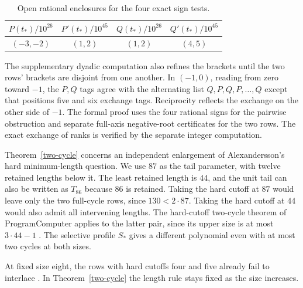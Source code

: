 \begin{table}[ht]
\centering
\begin{tabular}{@{}cccc@{}}
\hline
$P(t_\ast)/10^{26}$ & $P'(t_\ast)/10^{45}$ &
$Q(t_\ast)/10^{26}$ & $Q'(t_\ast)/10^{45}$\\ \hline
$(-3,-2)$ & $(1,2)$ & $(1,2)$ & $(4,5)$\\ \hline
\end{tabular}
\caption{Open rational enclosures for the four exact sign tests.}\label{two-cycle-signs}
\end{table}

The supplementary dyadic computation also refines the brackets until the two rows' brackets are disjoint from one another. In $(-1,0)$, reading from zero toward $-1$, the $P,Q$ tags agree with the alternating list $Q,P,Q,P,\ldots,Q$ except that positions five and six exchange tags. Reciprocity reflects the exchange on the other side of $-1$. The formal proof uses the four rational signs for the pairwise obstruction and separate full-axis negative-root certificates for the two rows. The exact exchange of ranks is verified by the separate integer computation.

Theorem~\ref{two-cycle} concerns an independent enlargement of Alexandersson's hard minimum-length question. We use $87$ as the tail parameter, with twelve retained lengths below it. The least retained length is $44$, and the unit tail can also be written as $T_{86}$ because $86$ is retained. Taking the hard cutoff at $87$ would leave only the two full-cycle rows, since $130<2\cdot87$. Taking the hard cutoff at $44$ would also admit all intervening lengths. The hard-cutoff two-cycle theorem of ProgramComputer applies to the latter pair, since its upper size is at most $3\cdot44-1$ \cite{pc-two}. The selective profile $S_\ast$ gives a different polynomial even with at most two cycles at both sizes.

At fixed size eight, the rows with hard cutoffs four and five already fail to interlace \cite{earlier}. In Theorem~\ref{two-cycle} the length rule stays fixed as the size increases.
